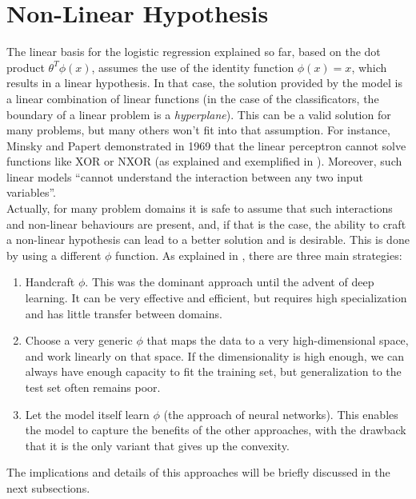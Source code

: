 \section{Non-Linear Hypothesis}\label{interaction}

The linear basis for the logistic regression explained so far, based on the dot product \(\theta^T\phi(x)\), assumes the use of the identity function \(\phi(x)=x\), which results in a linear hypothesis. In that case, the solution provided by the model is a linear combination of linear functions (in the case of the classificators, the boundary of a linear problem is a {\it hyperplane}).  This can be a valid solution for many problems, but many others won't fit into that assumption. For instance, Minsky and Papert demonstrated in 1969 that the linear perceptron cannot solve functions like XOR or NXOR (as explained and exemplified in \cite[p. 10]{deephist}). Moreover, such linear models ``cannot understand the interaction between any two input variables''\cite[p. 169]{goodfellow}.\\

Actually, for many problem domains it is safe to assume that such interactions and non-linear behaviours are present, and, if that is the case, the ability to craft a non-linear hypothesis can lead to a better solution and is desirable. This is done by using a different \(\phi\) function. As explained in \cite[p.169]{goodfellow}, there are three main strategies:
\begin{enumerate}
\item Handcraft \(\phi\). This was the dominant approach until the advent of deep learning. It can be very effective and efficient, but requires high specialization and has little transfer between domains.
\item Choose a very generic \(\phi\) that maps the data to a very high-dimensional space, and work linearly on that space. If the dimensionality is high enough, we can always have enough capacity to fit the training set, but generalization to the test set often remains poor.
\item Let the model itself learn \(\phi\) (the approach of neural networks). This enables the model to capture the benefits of the other approaches, with the drawback that it is the only variant that gives up the convexity.
\end{enumerate}

The implications and details of this approaches will be briefly discussed in the next subsections.



